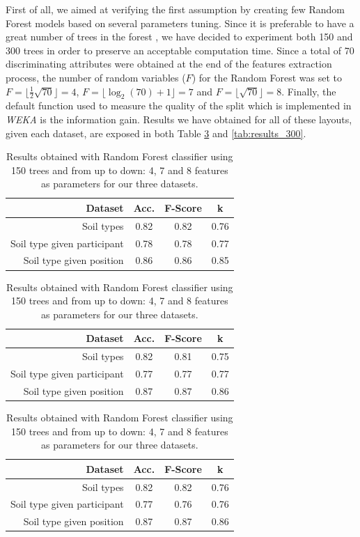 \documentclass[conference]{IEEEtran}
\begin{document}
First of all, we aimed at verifying the first assumption by creating few Random Forest models based on several parameters tuning. Since it is preferable to have a great number of trees in the forest \cite{Breiman2001}, we have decided to experiment both 150 and 300 trees in order to preserve an acceptable computation time. Since a total of 70 discriminating attributes were obtained at the end of the features extraction process, the number of random variables ($F$) for the Random Forest was set to $F=\lfloor\frac{1}{2}\sqrt{70}\rfloor=4$, $F=\lfloor\log_2(70)+1\rfloor=7$ and $F=\lfloor\sqrt{70}\rfloor=8$. Finally, the default function used to measure the quality of the split which is implemented in \textit{WEKA} is the information gain. Results we have obtained for all of these layouts, given each dataset, are exposed in both Table \ref{tab:results_150} and \ref{tab:results_300}.

\begin{table}[!ht]
  \centering
  \caption{Results obtained with Random Forest classifier using 150 trees and from up to down: 4, 7 and 8 features as parameters for our three datasets.}
  \label{tab:results_150}
  \begin{tabular}{rccc}
    \toprule
    \textbf{Dataset}&\textbf{Acc.}&\textbf{F-Score}&\textbf{k}\\
    \midrule
   	Soil types&0.82&0.82&0.76\\
    Soil type given participant&0.78&0.78&0.77\\
    Soil type given position&0.86&0.86&0.85\\
\end{tabular}
\begin{tabular}{rccc}
    \toprule
    \textbf{Dataset}&\textbf{Acc.}&\textbf{F-Score}&\textbf{k}\\
    \midrule
   	Soil types&0.82&0.81&0.75\\
    Soil type given participant&0.77&0.77&0.77\\
    Soil type given position&0.87&0.87&0.86\\
\end{tabular}
\begin{tabular}{rccc}
    \toprule
    \textbf{Dataset}&\textbf{Acc.}&\textbf{F-Score}&\textbf{k}\\
    \midrule
   	Soil types&0.82&0.82&0.76\\
    Soil type given participant&0.77&0.76&0.76\\
    Soil type given position&0.87&0.87&0.86\\
  \bottomrule
\end{tabular}
\end{table}
\end{document}

